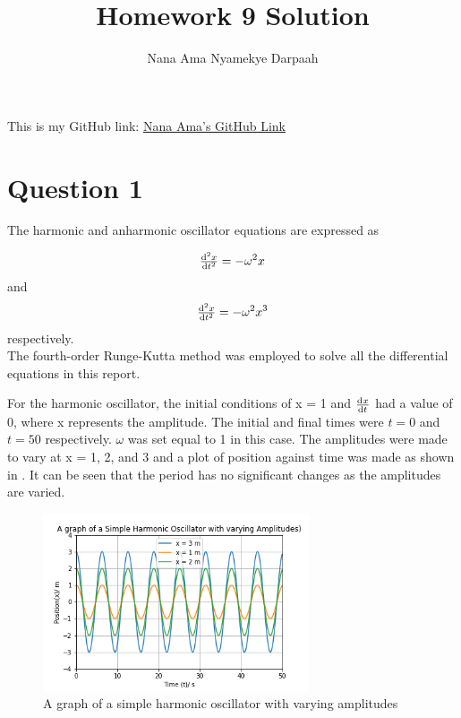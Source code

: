 \documentclass[11pt]{article}
\title{Homework 9 Solution}
\author{Nana Ama Nyamekye Darpaah}
\begin{document}
	
	\maketitle
	This is my GitHub link: \href{https://github.com/nnd2016/phys-ga2000.git}{Nana Ama's GitHub Link}
	
	\section{Question 1}
	The harmonic and anharmonic oscillator equations are expressed as 
	
\begin{equation}
	\od[2]{x}{t} = -\omega^{2} x
\end{equation}
 and 
\begin{equation}
	\od[2]{x}{t} = -\omega^{2} x^{3}
\end{equation}
	respectively.\\
	
	The fourth-order Runge-Kutta method was employed to solve all the differential equations in this report.
	
	For the harmonic oscillator, the initial conditions of x = 1 and $\od{x}{t}$ had a value of 0, where x represents the amplitude. The initial and final times were $t = 0$ and $t = 50$ respectively. $\omega$ was set equal to 1 in this case. The amplitudes were made to vary at x = 1, 2, and 3 and a plot of position against time was made as shown in . It can be seen that the period has no significant changes as the amplitudes are varied.
	
	\begin{figure}[!h]\begin{center} 
			\vspace{12pt}
			\includegraphics[width=0.7\textwidth]{harmonic.png} 
			\caption{A graph of a simple harmonic oscillator with varying amplitudes }
			\label{fig:harmonic} 
		\end{center}
	\end{figure}
\end{document}
